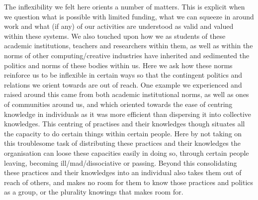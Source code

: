 The inflexibility we felt here orients a number of matters. This is
explicit when we question what is possible with limited funding, what we
can squeeze in around work and what (if any) of our activities are
understood as valid and valued within these systems. We also touched
upon how we as students of these academic institutions, teachers and
researchers within them, as well as within the norms of other
computing/creative industries have inherited and sedimented the politics
and norms of these bodies within us. Here we ask how these norms
reinforce us to be inflexible in certain ways so that the contingent
politics and relations we orient towards are out of reach. One example
we experienced and raised around this came from both academic
institutional norms, as well as ones of communities around us, and which
oriented towards the ease of centring knowledge in individuals as it was
more efficient than dispersing it into collective knowledges. This
centring of practises and their knowledges though situates all the
capacity to do certain things within certain people. Here by not taking
on this troublesome task of distributing these practices and their
knowledges the organisation can loose these capacities easily in doing
so, through certain people leaving, becoming ill/mad/dissociative or
passing. Beyond this consolidating these practices and their knowledges
into an individual also takes them out of reach of others, and makes no
room for them to know those practices and politics as a group, or the
plurality knowings that makes room for.

